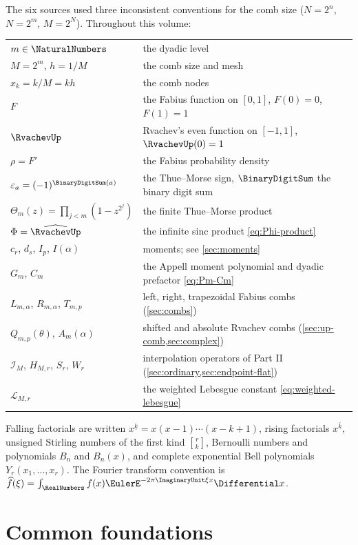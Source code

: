 \documentclass[11pt,oneside]{article}
\numberwithin{equation}{section}
\theoremstyle{definition}
\theoremstyle{remark}
\newcommand{\eps}{\varepsilon}
\newcommand{\fall}[2]{#1^{\underline{#2}}}
\newcommand{\rise}[2]{#1^{\overline{#2}}}
\newcommand{\stirlingfirst}[2]{\genfrac{[}{]}{0pt}{}{#1}{#2}}
\newcommand{\Bell}{Y}
\newcommand{\ThetaTM}{\Theta}
\newcommand{\Lag}{\mathcal I}
\newcommand{\Leb}{\mathscr L}
\begin{document}
The six sources used three inconsistent conventions for the comb size
($N=2^n$, $N=2^m$, $M=2^N$).  Throughout this volume:
\begin{center}
\small
\begin{tabular}{@{}ll@{}}
\toprule
$m\in\NaturalNumbers$ & the dyadic level\\
$M=2^m$, $h=1/M$ & the comb size and mesh\\
$x_k=k/M=kh$ & the comb nodes\\
$F$ & the Fabius function on $[0,1]$, $F(0)=0$, $F(1)=1$\\
$\RvachevUp$ & Rvachev's even function on $[-1,1]$, $\RvachevUp(0)=1$\\
$\rho=F'$ & the Fabius probability density\\
$\eps_a=(-1)^{\BinaryDigitSum(a)}$ & the Thue--Morse sign, $\BinaryDigitSum$ the binary digit sum\\
$\ThetaTM_m(z)=\prod_{j<m}(1-z^{2^j})$ & the finite Thue--Morse product\\
$\Phi=\widehat{\RvachevUp}$ & the infinite sinc product \eqref{eq:Phi-product}\\
$c_r$, $d_s$, $I_p$, $I(\alpha)$ & moments; see \cref{sec:moments}\\
$G_m$, $C_m$ & the Appell moment polynomial and dyadic prefactor \eqref{eq:Pm-Cm}\\
$L_{m,\alpha}$, $R_{m,\alpha}$, $T_{m,p}$ & left, right, trapezoidal Fabius combs (\cref{sec:combs})\\
$Q_{m,p}(\theta)$, $A_m(\alpha)$ & shifted and absolute Rvachev combs (\cref{sec:up-comb,sec:complex})\\
$\Lag_M$, $H_{M,r}$, $S_r$, $W_r$ & interpolation operators of Part II (\cref{sec:ordinary,sec:endpoint-flat})\\
$\Leb_{M,r}$ & the weighted Lebesgue constant \eqref{eq:weighted-lebesgue}\\
\bottomrule
\end{tabular}
\end{center}
Falling factorials are written $\fall xk=x(x-1)\cdots(x-k+1)$, rising
factorials $\rise xk$, unsigned Stirling numbers of the first kind
$\stirlingfirst rk$, Bernoulli numbers and polynomials $B_n$ and
$B_n(x)$, and complete exponential Bell polynomials
$\Bell_r(x_1,\dots,x_r)$.  The Fourier transform convention is
$\widehat f(\xi)=\int_\RealNumbers f(x)\EulerE^{-2\pi\ImaginaryUnit\xi x}\Differential x$.

\section{Common foundations}
\label{sec:foundations}
\end{document}
